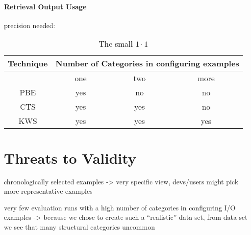 \documentclass[\myrootdir/main.tex]{subfiles}
\begin{document}
\paragraph{Retrieval Output Usage}
precision needed:

\begin{table}[htbp]
\begin{tabular}{|c||c|c|c|}
  Technique & \multicolumn{3}{|c|}{Number of Categories in configuring examples} \\
  \hline
  & one & two & more \\
  PBE & yes & no & no \\ 
  CTS & yes & yes & no \\ 
  KWS & yes & yes & yes \\ 
  \hline
\end{tabular}
\caption{The small $1 \cdot 1$}
\label{tab:101}
\end{table}

\section{Threats to Validity}
chronologically selected examples -> very specific view, devs/users might pick more representative examples

very few evaluation runs with a high number of categories in configuring I/O examples -> because we chose to create such a ``realistic'' data set, from data set we see that many structural categories uncommon
\end{document}
